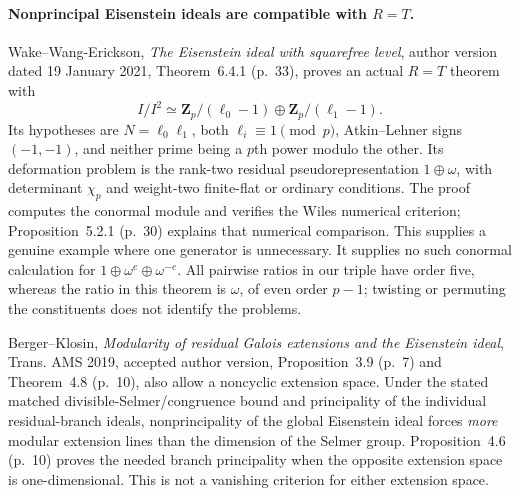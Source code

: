 \paragraph{Nonprincipal Eisenstein ideals are compatible with $R=T$.}
Wake--Wang-Erickson, \emph{The Eisenstein ideal with squarefree
level}, author version dated 19 January 2021,
Theorem~6.4.1 (p.~33), proves an actual $R=T$ theorem with
\[
 I/I^2\simeq
 \mathbf Z_p/(\ell_0-1)\oplus\mathbf Z_p/(\ell_1-1).            \tag{D2.6}
\]
Its hypotheses are $N=\ell_0\ell_1$, both
$\ell_i\equiv1\pmod p$, Atkin--Lehner signs $(-1,-1)$, and
neither prime being a $p$th power modulo the other.  Its
deformation problem is the rank-two residual
pseudorepresentation $1\oplus\omega$, with determinant
$\chi_p$ and weight-two finite-flat or ordinary conditions.
The proof computes the conormal module and verifies the
Wiles numerical criterion; Proposition~5.2.1 (p.~30) explains
that numerical comparison.  This supplies a genuine example
where one generator is unnecessary.  It supplies no such
conormal calculation for $1\oplus\omega^e\oplus\omega^{-e}$.
All pairwise ratios in our triple have order five, whereas the
ratio in this theorem is $\omega$, of even order $p-1$; twisting
or permuting the constituents does not identify the problems.

Berger--Klosin, \emph{Modularity of residual Galois extensions
and the Eisenstein ideal}, Trans. AMS 2019, accepted author
version, Proposition~3.9 (p.~7) and Theorem~4.8 (p.~10), also
allow a noncyclic extension space.  Under the stated matched
divisible-Selmer/congruence bound and principality of the
individual residual-branch ideals, nonprincipality of the
global Eisenstein ideal forces \emph{more} modular extension
lines than the dimension of the Selmer group.
Proposition~4.6 (p.~10) proves the needed branch principality
when the opposite extension space is one-dimensional.
This is not a vanishing criterion for either extension space.

